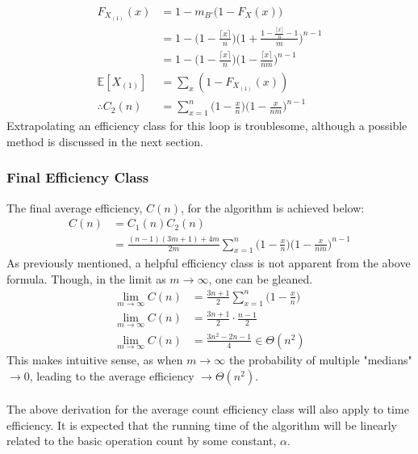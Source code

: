 \documentclass{article}
\begin{document}
\begin{align*}
F_{X_{(1)}}(x) &= 1 - m_{B'}\big(1-F_X(x)\big) \\
&= 1 - \bigg(1 - \frac{\lceil x \rceil}{n}\bigg)\Bigg(1 + \frac{1 - \frac{\lceil x \rceil}{n} - 1}{m}\Bigg)^{n-1} \\
&= 1 - \bigg(1 - \frac{\lceil x \rceil}{n}\bigg)\bigg(1 - \frac{\lceil x \rceil}{nm}\bigg)^{n-1} \\
\mathbb{E}[X_{(1)}] &= \sum_x (1 - F_{X_{(1)}}(x)) \\
\therefore C_2(n) &= \sum_{x=1}^n \Big(1 - \frac{x}{n}\Big)\Big(1 - \frac{x}{nm}\Big)^{n-1}
\end{align*}
Extrapolating an efficiency class for this loop is troublesome, although a possible method is discussed in the next section.


\subsubsection{Final Efficiency Class}
The final average efficiency, $C(n)$, for the algorithm is achieved below:
\begin{align*}
C(n) &= C_1(n)C_2(n) \\
&= \frac{(n-1)(3m+1) + 4m}{2m} \sum_{x=1}^n \Big(1 - \frac{x}{n}\Big)\Big(1 - \frac{x}{nm}\Big)^{n-1}
\end{align*}
As previously mentioned, a helpful efficiency class is not apparent from the above formula. Though, in the limit as $m\to\infty$, one can be gleaned.
\begin{align*}
\lim_{m\to\infty}C(n) &= \frac{3n+1}{2} \sum_{x=1}^n \Big(1 - \frac{x}{n}\Big) \\
\lim_{m\to\infty}C(n) &= \frac{3n+1}{2} \cdot \frac{n-1}{2} \\
\lim_{m\to\infty}C(n) &= \frac{3n^2-2n-1}{4} \in \Theta(n^2)
\end{align*}
This makes intuitive sense, as when $m\to\infty$ the probability of multiple "medians" $\to 0$, leading to the average efficiency $\to\Theta (n^2)$.\\
\\
The above derivation for the average count efficiency class will also apply to time efficiency. It is expected that the running time of the algorithm will be linearly related to the basic operation count by some constant, $\alpha$.
\end{document}
